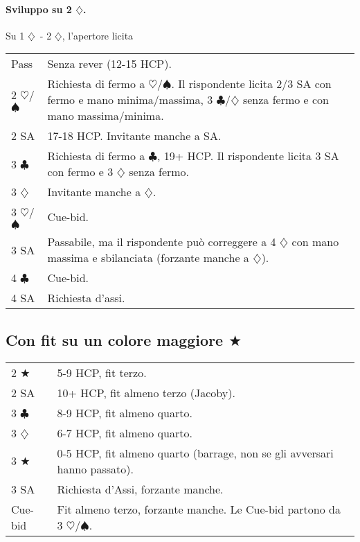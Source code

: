 \documentclass[a4paper,10pt]{article}
\renewcommand{\c}{$\clubsuit$\xspace}
\renewcommand{\d}{$\diamondsuit$\xspace}
\newcommand{\h}{$\heartsuit$\xspace}
\newcommand{\s}{$\spadesuit$\xspace}
\renewcommand{\j}{$\bigstar$\xspace}
\newcommand{\sa}{SA\xspace}
\newcommand{\smallspace}{\vskip0.3cm}
\newenvironment{twocol}
  {\smallspace\noindent\begin{tabular}{l p{0.78\textwidth}}}
  {\end{tabular}\smallspace}
\begin{document}
\paragraph{Sviluppo su 2 \d.}
Su 1 \d\ - 2 \d, l'apertore licita
\begin{twocol}
	Pass & Senza rever (12-15 HCP).\\
	2 \h/\s & Richiesta di fermo a \h/\s. Il rispondente licita 2/3 \sa con fermo e mano minima/massima, 3 \c/\d senza fermo e con mano massima/minima.\\
	2 \sa & 17-18 HCP. Invitante manche a \sa.\\
	3 \c & Richiesta di fermo a \c, 19+ HCP. Il rispondente licita 3 \sa con fermo e 3 \d senza fermo.\\
	3 \d & Invitante manche a \d.\\
	3 \h/\s & Cue-bid.\\
	3 \sa & Passabile, ma il rispondente può correggere a 4 \d con mano massima e sbilanciata (forzante manche a \d).\\
	4 \c & Cue-bid.\\
	4 \sa & Richiesta d'assi.
\end{twocol}

\subsection{Con fit su un colore maggiore \j}
\begin{twocol}
	2 \j  & 5-9 HCP, fit terzo.\\ 
	2 \sa & 10+ HCP, fit almeno terzo (Jacoby).\\
	3 \c  & 8-9 HCP, fit almeno quarto.\\
	3 \d  & 6-7 HCP, fit almeno quarto.\\
	3 \j  & 0-5 HCP, fit almeno quarto (barrage, non se gli avversari hanno passato).\\
	3 \sa & Richiesta d'Assi, forzante manche. \\
	Cue-bid & Fit almeno terzo, forzante manche. Le Cue-bid partono da 3 \h/\s.
\end{twocol}
\end{document}
